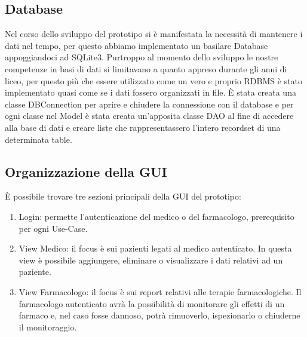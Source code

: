 \documentclass[a4paper, 11pt]{article}
\begin{document}
		\subsection{Database}
		Nel corso dello sviluppo del prototipo si è manifestata la necessità di mantenere i dati nel tempo, per questo abbiamo implementato un basilare Database appoggiandoci ad SQLite3. Purtroppo al momento dello sviluppo le nostre competenze in basi di dati si limitavano a quanto appreso durante gli anni di liceo, per questo più che essere utilizzato come un vero e proprio RDBMS  è stato implementato quasi come se i dati fossero organizzati in file.\newline
		È stata creata una classe DBConnection per aprire e chiudere la connessione con il database e per ogni classe nel Model è stata creata un'apposita classe DAO al fine di accedere alla base di dati e creare liste che rappresentassero l'intero recordset di una determinata table.
		 
		\subsection{Organizzazione della GUI}
		È possibile trovare tre sezioni principali della GUI del prototipo:
		\begin{enumerate}[label*=(\alph*)., nosep]
			\item Login: permette l'autenticazione del medico o del farmacologo, prerequisito per ogni Use-Case.
			\item View Medico: il focus è sui pazienti legati al medico autenticato. In questa view è possibile aggiungere, eliminare o visualizzare i dati relativi ad un paziente.
			\item View Farmacologo: il focus è sui report relativi alle terapie farmacologiche. Il farmacologo autenticato avrà la possibilità di monitorare gli effetti di un farmaco e, nel caso fosse dannoso, potrà rimuoverlo, ispezionarlo o chiuderne il monitoraggio. 
		\end{enumerate}
	
\end{document}
